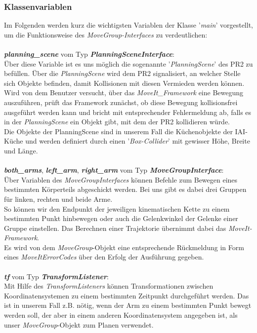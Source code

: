 \documentclass{suturo}
\begin{document}
\subsubsection{Klassenvariablen}
Im Folgenden werden kurz die wichtigsten Variablen der Klasse '\textit{main}' vorgestellt, um die Funktionsweise des \textit{MoveGroup-Interfaces} zu verdeutlichen:\\\\
\textit{\textbf{planning\_scene}} vom Typ \textit{\textbf{PlanningSceneInterface}}:\\
Über diese Variable ist es uns möglich die sogenannte '\textit{PlanningScene}' des PR2 zu befüllen. Über die \textit{PlanningScene} wird dem PR2 signalisiert, an welcher Stelle sich Objekte befinden, damit Kollisionen mit diesen Vermieden werden können. Wird von dem Benutzer versucht, über das \textit{MoveIt\_Framework} eine Bewegung auszuführen, prüft das Framework zunächst, ob diese Bewegung kollisionsfrei ausgeführt werden kann und bricht mit entsprechender Fehlermeldung ab, falls es in der \textit{PlanningScene} ein Objekt gibt, mit dem der PR2 kollidieren würde. \\
Die Objekte der PlanningScene sind in unserem Fall die Küchenobjekte der IAI-Küche und werden definiert durch einen '\textit{Box-Collider}' mit gewisser Höhe, Breite und Länge.\\\\
\textit{\textbf{both\_arms}}, \textit{\textbf{left\_arm}}, \textit{\textbf{right\_arm}} vom Typ \textit{\textbf{MoveGroupInterface}}:\\
Über Variablen des \textit{MoveGroupInterfaces} können Befehle zum Bewegen eines bestimmten Körperteils abgeschickt werden. Bei uns gibt es dabei drei Gruppen für linken, rechten und beide Arme.\\
So können wir den Endpunkt der jeweiligen kinematischen Kette zu einem bestimmten Punkt hinbewegen oder auch die Gelenkwinkel der Gelenke einer Gruppe einstellen. Das Berechnen einer Trajektorie übernimmt dabei das \textit{MoveIt-Framework}.\\
Es wird von dem \textit{MoveGroup}-Objekt eine entsprechende Rückmeldung in Form eines \textit{MoveItErrorCodes} über den Erfolg der Ausführung gegeben.\\\\
\textit{\textbf{tf}} vom Typ \textit{\textbf{TransformListener}}:\\
Mit Hilfe des \textit{TransformListeners} können Transformationen zwischen Koordinatensystemen zu einem bestimmten Zeitpunkt durchgeführt werden. Das ist in unserem Fall z.B. nötig, wenn der Arm zu einem bestimmten Punkt bewegt werden soll, der aber in einem anderen Koordinatensystem angegeben ist, als unser \textit{MoveGroup}-Objekt zum Planen verwendet.\\
\end{document}
